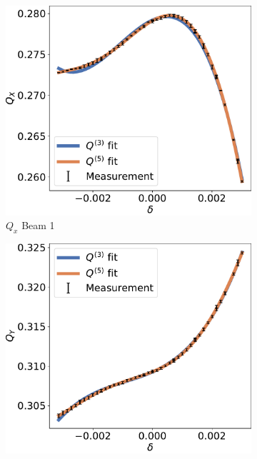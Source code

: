 \begin{figure}[H]
    \begin{subfigure}{0.49\textwidth}
        \centering
        \includegraphics[width=\textwidth]{./images/higher_orders/fidel_chroma/Beam1_Qx.pdf}
        \caption{$Q_x$ Beam 1}
        \label{}
    \end{subfigure}
    \hfill
    \begin{subfigure}{0.49\textwidth}
        \centering
        \includegraphics[width=\textwidth]{./images/higher_orders/fidel_chroma/Beam1_Qy.pdf}

\end{subfigure}
\end{figure}

